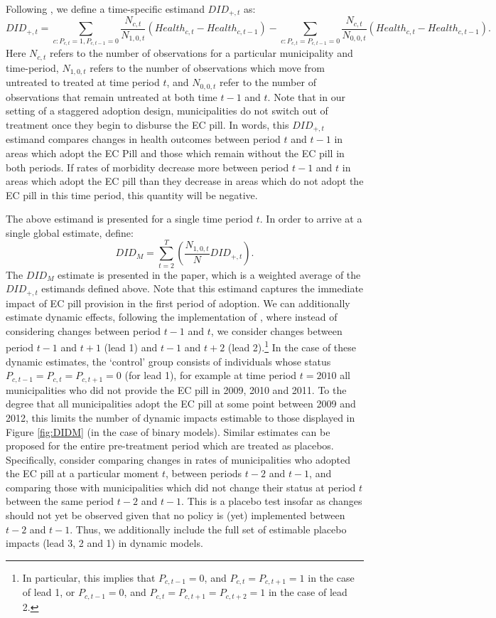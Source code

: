 \documentclass[12pt]{article}
\begin{document}
Following \citet{ChaisemartinDH2019}, we define a time-specific estimand $DID_{+,t}$ as:
\[
DID_{+,t}=\sum_{c:P_{c,t}=1,P_{c,t-1}=0}\frac{N_{c,t}}{N_{1,0,t}}\left(Health_{c,t}-Health_{c,t-1}\right)-\sum_{c:P_{c,t}=P_{c,t-1}=0}\frac{N_{c,t}}{N_{0,0,t}}\left(Health_{c,t}-Health_{c,t-1}\right).
\]
Here $N_{c,t}$ refers to the number of observations for a particular municipality and time-period, $N_{1,0,t}$ refers to the number of observations which move from untreated to treated at time period $t$, and $N_{0,0,t}$ refer to the number of observations that remain untreated at both time $t-1$ and $t$.  Note that in our setting of a staggered adoption design, municipalities do not switch out of treatment once they begin to disburse the EC pill.  In words, this $DID_{+,t}$ estimand compares changes in health outcomes between period $t$ and $t-1$ in areas which adopt the EC Pill and those which remain without the EC pill in both periods.  If rates of morbidity decrease more between period $t-1$ and $t$ in areas which adopt the EC pill than they decrease in areas which do not adopt the EC pill in this time period, this quantity will be negative.   

The above estimand is presented for a single time period $t$.  In order to arrive at a single global estimate, define:
\[
DID_M = \sum_{t=2}^T\left(\frac{N_{1,0,t}}{N}DID_{+,t}\right).
\]
The $DID_M$ estimate is presented in the paper, which is a weighted average of the $DID_{+,t}$ estimands defined above.  Note that this estimand captures the immediate impact of EC pill provision in the first period of adoption.  We can additionally estimate dynamic effects, following the implementation of \citet{dCDHG2019}, where instead of considering changes between period $t-1$ and $t$, we consider changes between period $t-1$ and $t+1$ (lead 1) and $t-1$ and $t+2$ (lead 2).\footnote{In particular, this implies that $P_{c,t-1}=0$, and $P_{c,t}=P_{c,t+1}=1$ in the case of lead 1, or $P_{c,t-1}=0$, and $P_{c,t}=P_{c,t+1}=P_{c,t+2}=1$ in the case of lead 2.}  In the case of these dynamic estimates, the `control' group consists of individuals whose status $P_{c,t-1}=P_{c,t}=P_{c,t+1}=0$ (for lead 1), for example at time period $t=2010$ all municipalities who did not provide the EC pill in 2009, 2010 and 2011.  To the degree that all municipalities adopt the EC pill at some point between 2009 and 2012, this limits the number of dynamic impacts estimable to those displayed in Figure \ref{fig:DIDM} (in the case of binary models).  Similar estimates can be proposed for the entire pre-treatment period which are treated as placebos.  Specifically, consider comparing changes in rates of municipalities who adopted the EC pill at a particular moment $t$, between periods $t-2$ and $t-1$, and comparing those with municipalities which did not change their status at period $t$ between the same period $t-2$ and $t-1$.  This is a placebo test insofar as changes should not yet be observed given that no policy is (yet) implemented between $t-2$ and $t-1$.  Thus, we additionally include the full set of estimable placebo impacts (lead 3, 2 and 1) in dynamic models.
\end{document}
